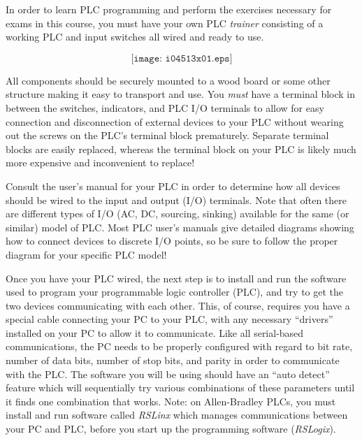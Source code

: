 

In order to learn PLC programming and perform the exercises necessary for exams in this course, you must have your own PLC {\it trainer} consisting of a working PLC and input switches all wired and ready to use.  

$$\texttt{[image: i04513x01.eps]}$$

All components should be securely mounted to a wood board or some other structure making it easy to transport and use.  You {\it must} have a terminal block in between the switches, indicators, and PLC I/O terminals to allow for easy connection and disconnection of external devices to your PLC without wearing out the screws on the PLC's terminal block prematurely.  Separate terminal blocks are easily replaced, whereas the terminal block on your PLC is likely much more expensive and inconvenient to replace!

Consult the user's manual for your PLC in order to determine how all devices should be wired to the input and output (I/O) terminals.  Note that often there are different types of I/O (AC, DC, sourcing, sinking) available for the same (or similar) model of PLC.  Most PLC user's manuals give detailed diagrams showing how to connect devices to discrete I/O points, so be sure to follow the proper diagram for your specific PLC model!

\vskip 10pt

Once you have your PLC wired, the next step is to install and run the software used to program your programmable logic controller (PLC), and try to get the two devices communicating with each other.  This, of course, requires you have a special cable connecting your PC to your PLC, with any necessary ``drivers'' installed on your PC to allow it to communicate.  Like all serial-based communications, the PC needs to be properly configured with regard to bit rate, number of data bits, number of stop bits, and parity in order to communicate with the PLC.  The software you will be using should have an ``auto detect'' feature which will sequentially try various combinations of these parameters until it finds one combination that works.  Note: on Allen-Bradley PLCs, you must  install and run software called {\it RSLinx} which manages communications between your PC and PLC, before you start up the programming software ({\it RSLogix}).

